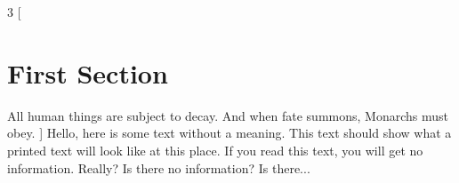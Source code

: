 \documentclass{article}
\begin{document}
\begin{multicols}{3} %
[ %
\section{First Section}
All human things are subject to decay. And when fate summons, Monarchs must obey.
]
Hello, here is some text without a meaning.  This text should show what 
a printed text will look like at this place.
If you read this text, you will get no information.  Really?  Is there 
no information?  Is there...

\end{multicols}
 
\end{document}
